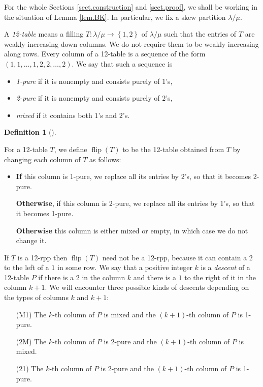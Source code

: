 \documentclass[numbers=enddot,12pt,final,onecolumn,notitlepage]{scrartcl}%
\theoremstyle{definition}
\newtheorem{defi}[theo]{Definition}
\newenvironment{definition}[1][]
{\begin{defi}[#1]\begin{leftbar}}
{\end{leftbar}\end{defi}}
\def\lm{{\lambda/\mu}}
\def\flip{{\operatorname{flip}}}
\begin{document}
For the whole Sections \ref{sect.construction} and \ref{sect.proof},
we shall be working in the situation of Lemma \ref{lem.BK}. In
particular, we fix a skew partition $\lm$.

A \textit{12-table} means a filling $T:\lm\rightarrow\left\{  1,2\right\}  $
of $\lm$
such that the entries of $T$ are weakly increasing down columns. We do not
require them to be weakly increasing along rows. Every column of a 12-table
is a sequence of the form $(1,1,\ldots,1,2,2,\ldots,2)$. We say that such a sequence is

\begin{itemize}
\item \textit{1-pure} if it is nonempty and consists purely of $1$'s,

\item \textit{2-pure} if it is nonempty and consists purely of $2$'s,

\item \textit{mixed} if it contains both $1$'s and $2$'s.
\end{itemize}

\def\flip{{\operatorname*{flip}}}

\begin{definition}
 \label{defi.flip}
For a 12-table $T$, we define $\flip(T)$ to be the 12-table obtained from $T$ by changing each column of $T$ as follows:

\begin{itemize}
\item \textbf{If} this column is 1-pure, we replace all its entries by $2$'s, so that it becomes 2-pure.

\textbf{Otherwise}, if this column is 2-pure, we replace all its entries by
$1$'s, so that it becomes 1-pure.

\textbf{Otherwise} this column is either mixed or empty, in which case we do not change it.
\end{itemize}

\end{definition}


If $T$ is a 12-rpp then $\flip(T)$ need not be a 12-rpp, because it can contain a $2$ to the left of a $1$ in some row. We say that a positive integer $k$ is a \textit{descent} of a 12-table $P$ if there is a $2$ in the column $k$ and there is a $1$ to the right of it in the column $k+1$. We will encounter three possible kinds of descents depending on the types of columns $k$ and $k+1$:

\begin{itemize}
\item[(M1)] The $k$-th column of $P$ is mixed and the $\left(  k+1\right)  $-th column of $P$ is 1-pure.

\item[(2M)] The $k$-th column of $P$ is 2-pure and the $\left(  k+1\right)  $-th column of $P$ is mixed.

\item[(21)] The $k$-th column of $P$ is 2-pure and the $\left(  k+1\right)  $-th column of $P$ is 1-pure.
\end{itemize}
\end{document}
